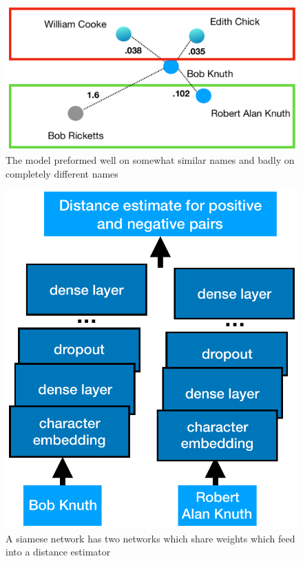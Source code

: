 \begin{figure}
\centering
\includegraphics[width=1\linewidth]{word_in_common}
\caption{The model preformed well on somewhat similar names and badly on completely different names}
\label{comp_dif_fail}
\end{figure}
\begin{figure}
\centering
\includegraphics[width=0.5\linewidth]{siamese_arc}
\caption{A siamese network has two networks which share weights which feed into a distance estimator}
\label{siamese}
\end{figure}
